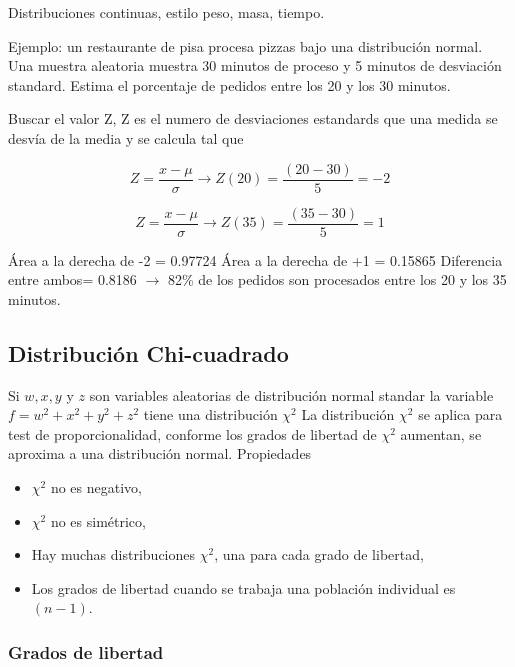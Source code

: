 \documentclass[]{article}
\begin{document}
Distribuciones continuas, estilo peso, masa, tiempo. 

Ejemplo: un restaurante de pisa procesa pizzas bajo una distribución normal. Una muestra aleatoria muestra 30 minutos de proceso y 5 minutos de desviación standard. Estima el porcentaje de pedidos entre los 20 y los 30 minutos.

Buscar el valor Z, Z es el numero de desviaciones estandards que una medida se desvía de la media y se calcula tal que

\begin{equation}
Z = \frac{x - \mu}{\sigma} \longrightarrow Z(20) = \frac{(20-30)}{5} = -2
\end{equation}

\begin{equation}
Z = \frac{x - \mu}{\sigma} \longrightarrow Z(35) = \frac{(35-30)}{5} = 1
\end{equation}

Área a la derecha de -2 = 0.97724 \newline
Área a la derecha de +1 = 0.15865 \newline
Diferencia entre ambos= 0.8186 $\longrightarrow$ 82\% de los pedidos son procesados entre los 20 y los 35 minutos.


\subsection{Distribución Chi-cuadrado}

Si $w, x, y$ y $z$ son variables aleatorias de distribución normal standar la variable $f = w^2 + x^2 + y^2 + z^2$ tiene una distribución $\chi^2$
La distribución $\chi^2$ se aplica para test de proporcionalidad, conforme los grados de libertad de $\chi^2$ aumentan, se aproxima a una distribución normal. Propiedades 

\begin{itemize}
	\item $\chi^2$ no es negativo,
	\item $\chi^2$ no es simétrico,
	\item Hay muchas distribuciones $\chi^2$, una para cada grado de libertad,
	\item Los grados de libertad cuando se trabaja una población individual es $(n-1)$.
\end{itemize}


\subsubsection{Grados de libertad}
\end{document}
